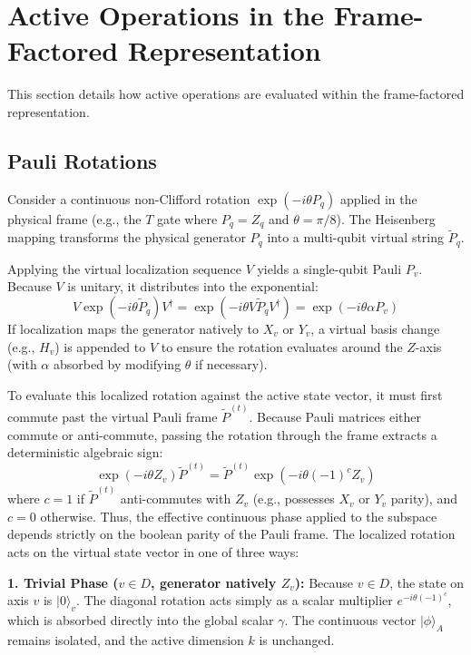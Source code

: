 \documentclass[a4paper, onecolumn, unpublished]{quantumarticle}
\begin{document}
    \section{Active Operations in the Frame-Factored Representation}
    \label{app:active_operations}

    This section details how active operations are evaluated within the frame-factored representation.

    \subsection{Pauli Rotations}
    \label{sec:continuous_rotations}

    Consider a continuous non-Clifford rotation $\exp(-i \theta P_q)$ applied in the physical frame (e.g., the $T$ gate where $P_q = Z_q$ and $\theta = \pi/8$). The Heisenberg mapping transforms the physical generator $P_q$ into a multi-qubit virtual string $\tilde{P}_q$.

    Applying the virtual localization sequence $V$ yields a single-qubit Pauli $P_v$. Because $V$ is unitary, it distributes into the exponential:
    \begin{equation}
    	V \exp\left(-i \theta \tilde{P}_q\right) V^\dagger = \exp\left(-i \theta V \tilde{P}_q V^\dagger\right) = \exp\left(-i \theta \alpha P_v\right)
    \end{equation}
    If localization maps the generator natively to $X_v$ or $Y_v$, a virtual basis change (e.g., $H_v$) is appended to $V$ to ensure the rotation evaluates around the $Z$-axis (with $\alpha$ absorbed by modifying $\theta$ if necessary).

    To evaluate this localized rotation against the active state vector, it must first commute past the virtual Pauli frame $\tilde{P}^{(t)}$. Because Pauli matrices either commute or anti-commute, passing the rotation through the frame extracts a deterministic algebraic sign:
    \begin{equation}
    	\exp\left(-i \theta Z_v\right) \tilde{P}^{(t)} = \tilde{P}^{(t)} \exp\left(-i \theta (-1)^c Z_v\right)
    \end{equation}
    where $c=1$ if $\tilde{P}^{(t)}$ anti-commutes with $Z_v$ (e.g., possesses $X_v$ or $Y_v$ parity), and $c=0$ otherwise. Thus, the effective continuous phase applied to the subspace depends strictly on the boolean parity of the Pauli frame. The localized rotation acts on the virtual state vector in one of three ways:

    \textbf{1. Trivial Phase ($v \in D$, generator natively $Z_v$):}
    Because $v \in D$, the state on axis $v$ is $|0\rangle_v$. The diagonal rotation acts simply as a scalar multiplier $e^{-i\theta(-1)^c}$, which is absorbed directly into the global scalar $\gamma$. The continuous vector $|\phi\rangle_A$ remains isolated, and the active dimension $k$ is unchanged.
\end{document}
